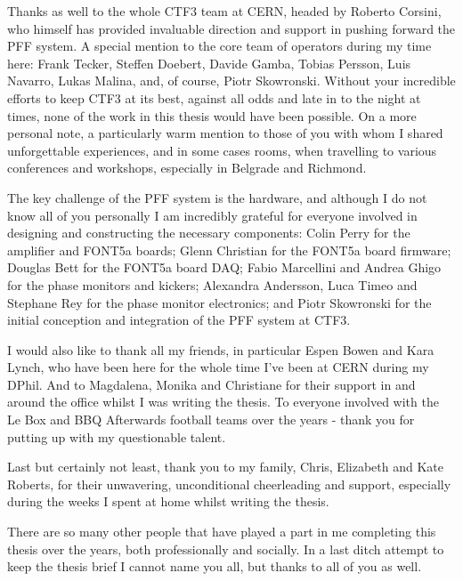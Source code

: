 Thanks as well to the whole CTF3 team at CERN, headed by Roberto Corsini, who himself has provided invaluable direction and support in pushing forward the PFF system. A special mention to the core team of operators during my time here: Frank Tecker, Steffen Doebert, Davide Gamba, Tobias Persson, Luis Navarro, Lukas Malina, and, of course, Piotr Skowronski. Without your incredible efforts to keep CTF3 at its best, against all odds and late in to the night at times, none of the work in this thesis would have been possible. On a more personal note, a particularly warm mention to those of you with whom I shared unforgettable experiences, and in some cases rooms, when travelling to various conferences and workshops, especially in Belgrade and Richmond. %

The key challenge of the PFF system is the hardware, and although I do not know all of you personally I am incredibly grateful for everyone involved in designing and constructing the necessary components: Colin Perry for the amplifier and FONT5a boards; Glenn Christian for the FONT5a board firmware; Douglas Bett for the FONT5a board DAQ; Fabio Marcellini and Andrea Ghigo for the phase monitors and kickers; Alexandra Andersson, Luca Timeo and Stephane Rey for the phase monitor electronics; and Piotr Skowronski for the initial conception and integration of the PFF system at CTF3. 

I would also like to thank all my friends, in particular Espen Bowen and Kara Lynch, who have been here for the whole time I've been at CERN during my DPhil. And to Magdalena, Monika and Christiane for their support in and around the office whilst I was writing the thesis. To everyone involved with the Le Box and BBQ Afterwards football teams over the years - thank you for putting up with my questionable talent.

Last but certainly not least, thank you to my family, Chris, Elizabeth and Kate Roberts, for their unwavering, unconditional cheerleading and support, especially during the weeks I spent at home whilst writing the thesis.

There are so many other people that have played a part in me completing this thesis over the years, both professionally and socially. In a last ditch attempt to keep the thesis brief I cannot name you all, but thanks to all of you as well.

\cleardoublepage

\tableofcontents

